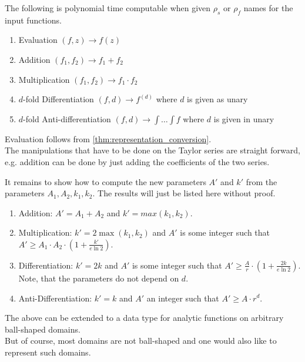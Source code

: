 	 \begin{theorem}\label{thm:polytime_on_ball}
	 	The following is polynomial time computable when given $\rho_s$ or $\rho_f$ names for the input functions.
	 	\begin{enumerate}
	 		\item Evaluation $(f,z) \to f(z)$
	 		\item Addition $(f_1, f_2) \to f_1 + f_2$
	 		\item Multiplication $(f_1, f_2) \to f_1 \cdot f_2$
	 		\item $d$-fold Differentiation $(f,d) \to f^{(d)}$ where $d$ is given as unary
	 		\item $d$-fold Anti-differentiation $(f,d) \to \int \dots \int f$ where $d$ is given in unary
	 	\end{enumerate}
    \begin{proofsketch}
	 		Evaluation follows from \ref{thm:representation_conversion}. \\
	 		The manipulations that have to be done on the Taylor series are straight forward, 
      e.g. addition can be done by just adding the coefficients of the two series.
      
	 		It remains to show how to compute the new parameters $A'$ and $k'$ from the parameters $A_1, A_2, k_1, k_2$. 
      The results will just be listed here without proof.
      \begin{enumerate}
        \item Addition: $A' = A_1 + A_2$ and $k' = max(k_1, k_2)$.
        \item Multiplication: $k' = 2\max(k_1, k_2)$ and $A'$ is some integer such that $A' \geq A_1 \cdot A_2 \cdot (1 + \frac{k'}{e \ln 2})$.
        \item Differentiation: $k' = 2k$ and $A'$ is some integer such that $A' \geq \frac{A}{r} \cdot (1+\frac{2k}{e\ln 2})$.
          Note, that the parameters do not depend on $d$.
        \item Anti-Differentiation: $k' = k$ and $A'$ an integer such that $A' \geq A \cdot r^d$.
      \end{enumerate}
	 	\end{proofsketch}
	 \end{theorem}

	The above can be extended to a data type for analytic functions on arbitrary ball-shaped domains.\\
	But of course, most domains are not ball-shaped and one would also like to represent such domains.
	
